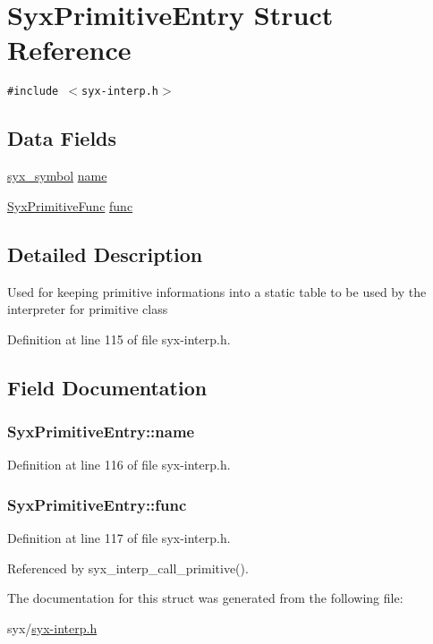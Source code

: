 \hypertarget{struct_syx_primitive_entry}{
\section{SyxPrimitiveEntry Struct Reference}
\label{struct_syx_primitive_entry}
}
{\tt \#include $<$syx-interp.h$>$}

\subsection*{Data Fields}
\begin{CompactItemize}
\item 
\hyperlink{syx-types_8h_9663af54b7b72f5d8be5f754ef356525}{syx\_\-symbol} \hyperlink{struct_syx_primitive_entry_4659f741751ee8361827fbc4ee325895}{name}
\item 
\hyperlink{syx-interp_8h_3c7eb85b3ff9105a45f6ff8a4efb6462}{SyxPrimitiveFunc} \hyperlink{struct_syx_primitive_entry_282d8d064c8dbf853587ce64485f2bf0}{func}
\end{CompactItemize}


\subsection{Detailed Description}
Used for keeping primitive informations into a static table to be used by the interpreter for primitive class 

Definition at line 115 of file syx-interp.h.

\subsection{Field Documentation}
\hypertarget{struct_syx_primitive_entry_4659f741751ee8361827fbc4ee325895}{
\subsubsection{ {\bf SyxPrimitiveEntry::name}}}
\label{struct_syx_primitive_entry_4659f741751ee8361827fbc4ee325895}




Definition at line 116 of file syx-interp.h.\hypertarget{struct_syx_primitive_entry_282d8d064c8dbf853587ce64485f2bf0}{
\subsubsection{ {\bf SyxPrimitiveEntry::func}}}
\label{struct_syx_primitive_entry_282d8d064c8dbf853587ce64485f2bf0}




Definition at line 117 of file syx-interp.h.

Referenced by syx\_\-interp\_\-call\_\-primitive().

The documentation for this struct was generated from the following file:\begin{CompactItemize}
\item 
syx/\hyperlink{syx-interp_8h}{syx-interp.h}\end{CompactItemize}
